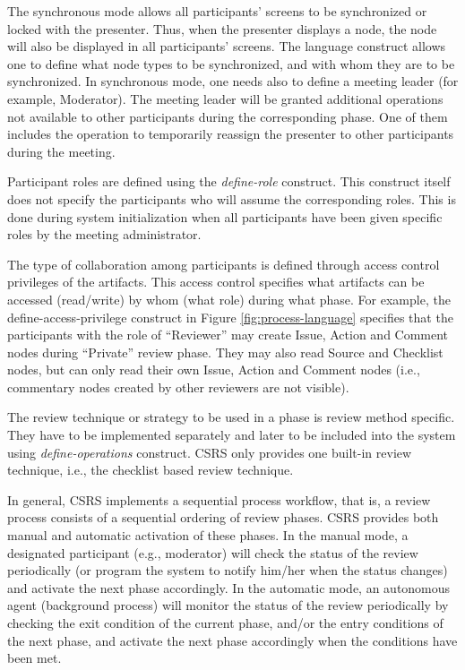 The synchronous mode allows all participants' screens to be
synchronized or locked with the presenter.
Thus, when the presenter displays a node, the node will also be
displayed in all participants' screens. 
The language construct allows one to define what node types to be
synchronized, and with whom they are to be synchronized. In
synchronous mode, one needs also to define a meeting leader (for
example, Moderator). The meeting leader will be granted additional 
operations not available to other participants during the
corresponding phase. One of them includes the operation to 
temporarily reassign the presenter to other participants during the
meeting. 

Participant roles are defined using the {\it define-role} construct. 
This construct itself does not specify the participants who will
assume the corresponding roles. This is done during system
initialization when all participants have been given specific
roles by the meeting administrator.

The type of collaboration among participants is defined through access
control privileges of the artifacts. This access control specifies
what artifacts can be 
accessed (read/write) by whom (what role) during what phase.
For example, the define-access-privilege construct in Figure
\ref{fig:process-language} specifies
that the participants with the role of
``Reviewer'' may create Issue, Action and Comment nodes during 
``Private'' review phase. They may also read Source
and Checklist nodes, but can only read their own Issue, Action and
Comment nodes (i.e., commentary nodes created by other reviewers are
not visible).

The review technique or strategy to be used in a phase is review
method specific. They have to be implemented
separately and later to be included into the system using {\it
define-operations} construct. 
CSRS only provides one built-in review technique, i.e., the
checklist based review technique.

%

In general, CSRS implements a sequential process workflow, that is, a
review process consists of a sequential ordering of review phases.
CSRS provides both manual and automatic
activation of these phases. In the manual mode, a designated participant
(e.g., moderator) will check the status of the review periodically (or
program the system to notify him/her when the status changes) and activate
the next phase accordingly. In the automatic mode, an autonomous agent
(background process) will monitor the status of the review
periodically by checking the exit condition of the current phase, and/or
the entry conditions of the next phase, and activate the next phase
accordingly when the conditions have been met.

